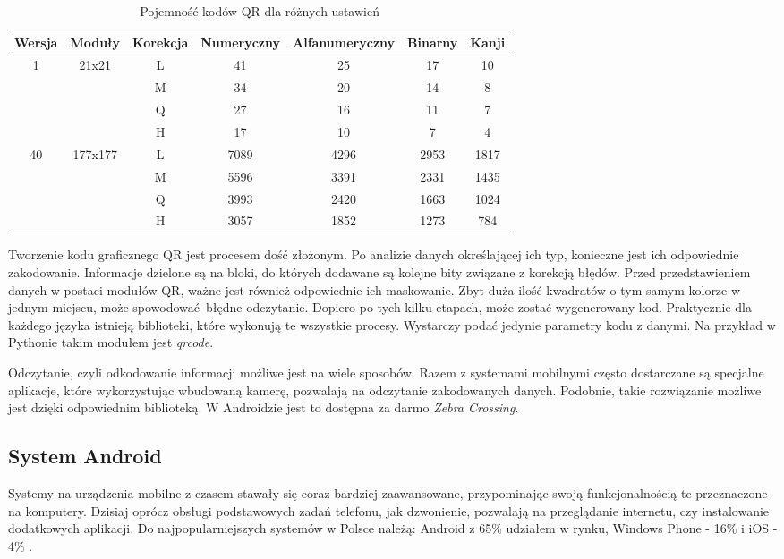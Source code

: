 \begin{table}[h]
	\caption{Pojemność kodów QR dla różnych ustawień}
	\vspace{0.3cm}
	\begin{center}
		\begin{tabular}{| c | c | c | c | c | c | c |}
			\hline
			Wersja & Moduły & Korekcja & Numeryczny & Alfanumeryczny & Binarny & Kanji\\
			\hline
			\multirow{4}{*}{1} & \multirow{4}{*}{21x21}&L&41&25&17&10\\
			& & M&34&20&14&8\\
			& & Q&27&16&11&7\\
			& & H&17&10&7&4\\
			\hline
			\multirow{4}{*}{40} & \multirow{4}{*}{177x177}&L&7089&4296&2953&1817\\
			& & M&5596&3391&2331&1435\\
			& & Q&3993&2420&1663&1024\\
			& & H&3057&1852&1273&784\\
			\hline
		\end{tabular}
	\end{center}
\end{table}

Tworzenie kodu graficznego QR jest procesem dość złożonym. Po analizie danych określającej ich typ, konieczne jest ich odpowiednie zakodowanie. Informacje dzielone są na bloki, do których dodawane są kolejne bity związane z korekcją błędów. Przed przedstawieniem danych w postaci modułów QR, ważne jest również odpowiednie ich maskowanie. Zbyt duża ilość kwadratów o tym samym kolorze w jednym miejscu, może spowodować błędne odczytanie. Dopiero po tych kilku etapach, może zostać wygenerowany kod. Praktycznie dla każdego języka istnieją biblioteki, które wykonują te wszystkie procesy. Wystarczy podać jedynie parametry kodu z danymi. Na przykład w Pythonie takim modułem jest \textit{qrcode}.

Odczytanie, czyli odkodowanie informacji możliwe jest na wiele sposobów. Razem z systemami mobilnymi często dostarczane są specjalne aplikacje, które wykorzystując wbudowaną kamerę, pozwalają na odczytanie zakodowanych danych. Podobnie, takie rozwiązanie możliwe jest dzięki odpowiednim biblioteką. W Androidzie jest to dostępna za darmo \textit{Zebra Crossing}.


\subsection{System Android}
Systemy na urządzenia mobilne z czasem stawały się coraz bardziej zaawansowane, przypominając swoją funkcjonalnością te przeznaczone na komputery. Dzisiaj oprócz obsługi podstawowych zadań telefonu, jak dzwonienie, pozwalają na przeglądanie internetu, czy instalowanie dodatkowych aplikacji. Do najpopularniejszych systemów w Polsce należą: Android z 65\% udziałem w rynku, Windows Phone - 16\% i iOS - 4\% \cite{polska_jest_mobi}.


